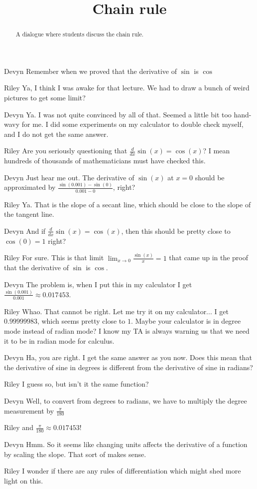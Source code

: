 \documentclass{ximera}
\title[Break-Ground:]{Chain rule}
\begin{document}
\begin{abstract}
A dialogue where students discuss the chain rule.
\end{abstract}
\maketitle

\begin{dialogue}
\item[Devyn] Remember when we proved that the derivative of $\sin$ is $\cos$
\item[Riley] Ya, I think I was awake for that lecture.  We had to draw a bunch of weird pictures to get some limit?
\item[Devyn]  Ya.  I was not quite convinced by all of that.  Seemed a little bit too hand-wavy for me.  I did some experiments on my calculator to double check myself, and I do not get the same answer.
\item[Riley] Are you seriously questioning that $\frac{d}{dx} \sin(x) = \cos(x)$?  I mean hundreds of thousands of mathematicians must have checked this. 
\item[Devyn] Just hear me out.  The derivative of $\sin(x)$ at $x =0$ should be approximated by $\frac{\sin(0.001) - \sin(0)}{ 0.001 - 0}$, right?
\item[Riley] Ya.  That is the slope of a secant line, which should be close to the slope of the tangent line.
\item[Devyn] And if $\frac{d}{dx} \sin(x) = \cos(x)$, then this should be pretty close to $\cos(0) = 1$ right?
\item[Riley] For sure.  This is that limit $\lim_{x \to 0} \frac{\sin(x)}{x} = 1$ that came up in the proof that the derivative of $\sin$ is $\cos$.
\item[Devyn] The problem is, when I put this in my calculator I get $\frac{\sin(0.001)}{0.001} \approx 0.017453$.
\item[Riley] Whao.  That cannot be right.  Let me try it on my calculator...  I get $0.99999983$, which seems pretty close to $1$.  Maybe your calculator is in degree mode instead of radian mode?  I know my TA is always warning us that we need it to be in radian mode for calculus.
\item[Devyn] Ha, you are right.  I get the same answer as you now.  Does this mean that the derivative of sine in degrees is different from the derivative of sine in radians?
\item[Riley] I guess so, but isn't it the same function?
\item[Devyn] Well, to convert from degrees to radians, we have to multiply the degree measurement by $\frac{\pi}{180}$
\item[Riley] and $\frac{\pi}{180} \approx 0.017453$!
\item[Devyn] Hmm.  So it seems like changing units affects the derivative of a function by scaling the slope.  That sort of makes sense.
\item[Riley] I wonder if there are any rules of differentiation which might shed more light on this. 
\end{dialogue}
\end{document}
